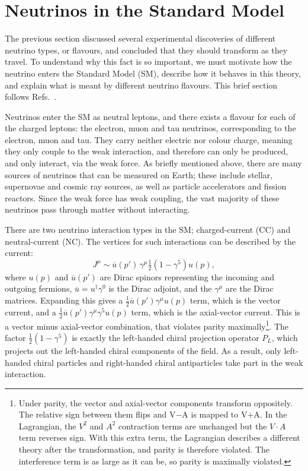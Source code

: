\section{Neutrinos in the Standard Model}
\label{sec:sm}

The previous section discussed several experimental discoveries of different neutrino types, or flavours, and concluded that they should transform as they travel. To understand why this fact is so important, we must motivate how the neutrino enters the Standard Model (SM), describe how it behaves in this theory, and explain what is meant by different neutrino flavours. This brief section follows Refs.~\cite{CottinghamGreenwood2007,Thomson2013,Zuber2020}.

Neutrinos enter the SM as neutral leptons, and there exists a flavour for each of the charged leptons: the electron, muon and tau neutrinos, corresponding to the electron, muon and tau. They carry neither electric nor colour charge, meaning they only couple to the weak interaction, and therefore can only be produced, and only interact, via the weak force. As briefly mentioned above, there are many sources of neutrinos that can be measured on Earth; these include stellar, supernovae and cosmic ray sources, as well as particle accelerators and fission reactors. Since the weak force has weak coupling, the vast majority of these neutrinos pass through matter without interacting.

There are two neutrino interaction types in the SM; charged-current (CC) and neutral-current (NC). The vertices for such interactions can be described by the current:
\begin{equation}
    J^{\mu}\sim\overline{u}(p')\,\gamma^{\mu}\tfrac{1}{2}\left(1-\gamma^{5}\right)u(p),
    \label{eq:charged-current}
\end{equation}
where $u(p)$ and $\overline{u}(p')$ are Dirac spinors representing the incoming and outgoing fermions, $\overline{u}=u^{\dagger}\gamma^{0}$ is the Dirac adjoint, and the $\gamma^{\mu}$ are the Dirac matrices. Expanding this gives a $\frac{1}{2}\overline{u}(p')\gamma^{\mu}u(p)$ term, which is the vector current, and a $\frac{1}{2}\overline{u}(p')\gamma^{\mu}\gamma^{5}u(p)$ term, which is the axial-vector current. This is a vector minus axial-vector combination, that violates parity maximally\footnote{Under parity, the vector and axial-vector components transform oppositely. The relative sign between them flips and V$-$A is mapped to V$+$A. In the Lagrangian, the $V^{2}$ and $A^{2}$ contraction terms are unchanged but the $V\cdot A$ term reverses sign. With this extra term, the Lagrangian describes a different theory after the transformation, and parity is therefore violated. The interference term is as large as it can be, so parity is maximally violated.}.
The factor $\tfrac{1}{2}\left(1-\gamma^{5}\right)$ is exactly the left-handed chiral projection operator $P_{L}$, which projects out the left-handed chiral components of the field. As a result, only left-handed chiral particles and right-handed chiral antiparticles take part in the weak interaction.

